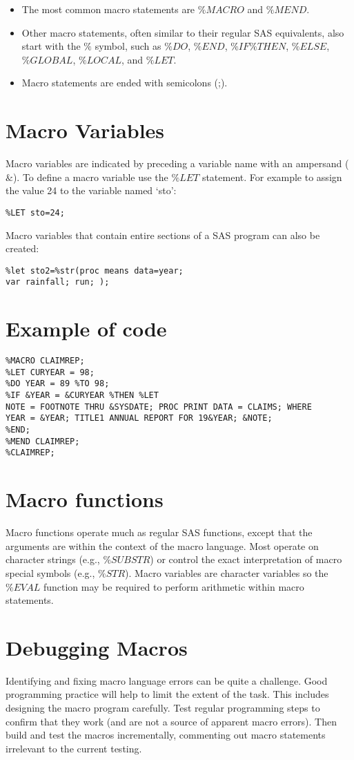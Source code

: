 \documentclass[12pt, a4paper]{report}
\begin{document}
\begin{itemize}
\item The most common macro statements are $\%MACRO$ and $\%MEND$.
\item Other macro statements, often similar to their regular SAS
equivalents, also start with the $\%$ symbol, such as $\%DO$,
$\%END$, $\%IF\%THEN$, $\%ELSE$, $\%GLOBAL$, $\%LOCAL$, and
$\%LET$. \item Macro statements are ended with semicolons (;).
\end{itemize}

\section{Macro Variables}
Macro variables are indicated by preceding a variable name with an
ampersand ($\&$). To define a macro variable use the $\%LET$
statement. For example to assign the value 24 to the variable
named `sto':
\begin{verbatim}
%LET sto=24;
\end{verbatim}

Macro variables that contain entire sections of a SAS program can
also be created:
\begin{verbatim}
%let sto2=%str(proc means data=year;
var rainfall; run; );
\end{verbatim}

\section{Example of code}
\begin{verbatim}%MACRO CLAIMREP;
%LET CURYEAR = 98;
%DO YEAR = 89 %TO 98;
%IF &YEAR = &CURYEAR %THEN %LET
NOTE = FOOTNOTE THRU &SYSDATE; PROC PRINT DATA = CLAIMS; WHERE
YEAR = &YEAR; TITLE1 ANNUAL REPORT FOR 19&YEAR; &NOTE;
%END;
%MEND CLAIMREP;
%CLAIMREP;
\end{verbatim}


\section{Macro functions}
Macro functions operate much as regular SAS functions, except that
the arguments are within the context of the macro language. Most
operate on character strings (e.g., $\%SUBSTR$) or control the
exact interpretation of macro special symbols (e.g., $\%STR$).
Macro variables are character variables so the $\%EVAL$ function
may be required to perform arithmetic within macro statements.

\section{Debugging Macros}
Identifying and fixing macro language errors can be quite a
challenge. Good programming practice will help to limit the extent
of the task. This includes designing the macro program carefully.
Test regular programming steps to confirm that they work (and are
not a source of apparent macro errors). Then build and test the
macros incrementally, commenting out macro statements irrelevant
to the current testing.
\end{document}
